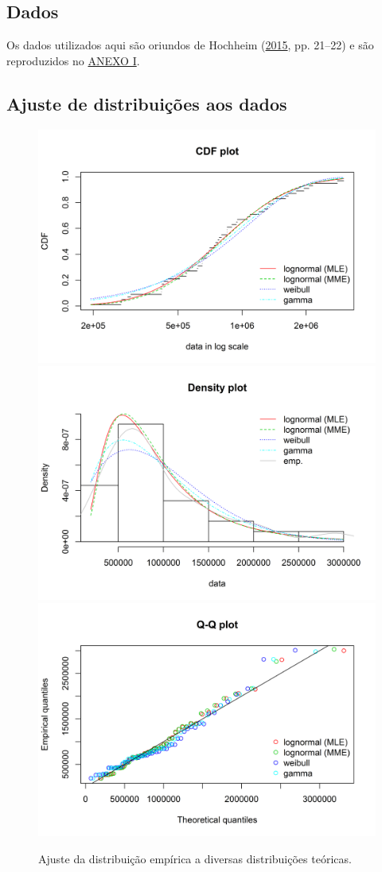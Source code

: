\documentclass[a4paper]{article}
\begin{document}
\subsection{Dados}\label{dados}

Os dados utilizados aqui são oriundos de Hochheim
(\protect\hyperlink{ref-hochheim}{2015}, pp. 21--22) e são reproduzidos
no \protect\hyperlink{anexo-i}{ANEXO I}.

\subsection{Ajuste de distribuições aos
dados}\label{ajuste-de-distribuicoes-aos-dados}

\begin{figure}[H]

{\centering \includegraphics[width=0.49\linewidth]{images/fitdist-1} \includegraphics[width=0.49\linewidth]{images/fitdist-2} \includegraphics[width=0.49\linewidth]{images/fitdist-3} 

}

\caption{Ajuste da distribuição empírica a diversas distribuições teóricas.}\label{fig:fitdist}
\end{figure}
\end{document}
